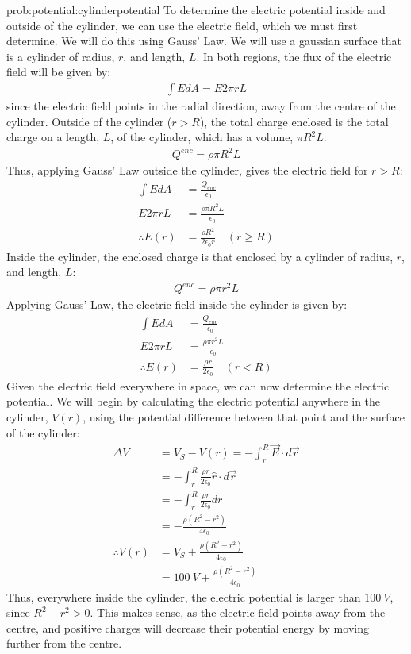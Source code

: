 \begin{solution}{prob:potential:cylinderpotential}\label{soln:potential:cylinderpotential}
To determine the electric potential inside and outside of the cylinder, we can use the electric field, which we must first determine. We will do this using Gauss' Law. We will use a gaussian surface that is a cylinder of radius, $r$, and length, $L$. In both regions, the flux of the electric field will be given by:
\begin{align*}
\int E dA  = E 2\pi rL
\end{align*}
since the electric field points in the radial direction, away from the centre of the cylinder. Outside of the cylinder ($r>R$), the total charge enclosed is the total charge on a length, $L$, of the cylinder, which has a volume, $\pi R^2 L$:
\begin{align*}
Q^{enc}=\rho \pi R^2 L
\end{align*} 
Thus, applying Gauss' Law outside the cylinder, gives the electric field for $r>R$:
\begin{align*}
\int E dA &= \frac{Q_{enc}}{\epsilon_0}\\
E 2\pi rL &= \frac{\rho \pi R^2 L}{\epsilon_0}\\
\therefore E(r) &= \frac{\rho R^2}{2\epsilon_0r}\quad(r\geq R)
\end{align*}
Inside the cylinder, the enclosed charge is that enclosed by a cylinder of radius, $r$, and length, $L$:
\begin{align*}
Q^{enc}=\rho \pi r^2 L
\end{align*}
Applying Gauss' Law, the electric field inside the cylinder is given by:
\begin{align*}
\int E dA &= \frac{Q_{enc}}{\epsilon_0}\\
E 2\pi rL &= \frac{\rho \pi r^2 L}{\epsilon_0}\\
\therefore E(r) &= \frac{\rho r}{2\epsilon_0}\quad(r<R)
\end{align*}
Given the electric field everywhere in space, we can now determine the electric potential.  We will begin by calculating the electric potential anywhere in the cylinder, $V(r)$, using the potential difference between that point and the surface of the cylinder:
\begin{align*}
\Delta V &= V_S - V(r) = -\int_{r}^{R} \vec E\cdot d \vec r\\
&= -\int_{r}^{R} \frac{\rho r}{2\epsilon_0} \hat r \cdot d \vec r\\
&= -\int_{r}^{R} \frac{\rho r}{2\epsilon_0} dr\\
&= -\frac{\rho (R^2-r^2)}{4\epsilon_0}\\
\therefore V(r) &= V_S + \frac{\rho (R^2-r^2)}{4\epsilon_0}\\
&=\SI{100}{V}+\frac{\rho (R^2-r^2)}{4\epsilon_0}
\end{align*}
Thus, everywhere inside the cylinder, the electric potential is larger than $\SI{100}{V}$, since $R^2-r^2>0$. This makes sense, as the electric field points away from the centre, and positive charges will decrease their potential energy by moving further from the centre.


\end{solution}
